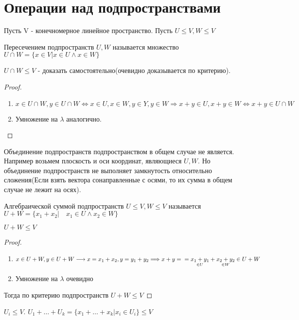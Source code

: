 \section{Операции над подпространствами}
Пусть V - конечномерное линейное пространство. Пусть \(U\le V, W\le V\)
\begin{definition}
	Пересечением подпространств \(U, W\) называется множество \(U\cap W = \{x\in V | x\in U \wedge x\in W\}\)
\end{definition}
\begin{proposition}
	\(U\cap W\le V\) - доказать самостоятельно(очевидно доказывается по критерию).
\end{proposition}
\begin{proof}
	\begin{enumerate}
		\item \(x\in U\cap W, y \in U\cap W \Longleftrightarrow x\in U, x\in W, y\in Y, y\in W\Longrightarrow x+y\in U, x+y\in W\Longleftrightarrow x+y\in U\cap W\)
		\item Умножение на $\lambda$ аналогично.	
	\end{enumerate}
\end{proof}
\begin{note}
	Объединение подпространств подпространством в общем случае не является. Например возьмем плоскость и оси координат, являющиеся \(U, W\). Но объединение подпространств не выполняет замкнутость относительно сложения(Если взять вектора сонаправленные с осями, то их сумма в общем случае не лежит на осях).
\end{note}
\begin{definition}
	Алгебраической суммой подпространств \(U\le V, W\le V\) называется \(U+W = \{x_1 + x_2 | \quad  x_1\in U \wedge x_2\in W\}\)
\end{definition}
\begin{proposition}
	\(U+W\le V\)
\end{proposition}
\begin{proof}
	\begin{enumerate}
		\item \(x\in U+W, y\in U+W\longrightarrow x = x_1 + x_2, y = y_1 + y_2 \Longrightarrow x+y = \\ =\underset{\in U}{x_1 + y_1} + \underset{\in W}{x_2 + y_2}\in U+W\)
		\item Умножение на $\lambda$ очевидно
	\end{enumerate}
	Тогда по критерию подпространств \(U+W\le V\)
\end{proof}
\begin{corollary}
	\(U_i\le V\). \(U_1 + \ldots + U_k = \{x_1 + \ldots + x_k| x_i\in U_i\}\le V\)	
\end{corollary}
